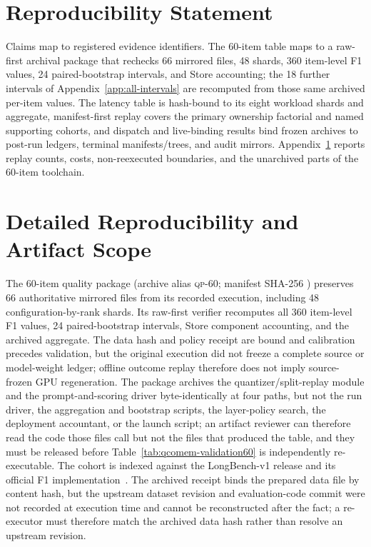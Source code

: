 \documentclass{article}
\begin{document}
\section*{Reproducibility Statement}
Claims map to registered evidence identifiers. The 60-item table maps to a
raw-first archival package that rechecks 66 mirrored files, 48 shards, 360
item-level F1 values, 24 paired-bootstrap intervals, and Store accounting; the
18 further intervals of Appendix~\ref{app:all-intervals} are recomputed from
those same archived per-item values. The latency table is hash-bound to its
eight workload shards and aggregate, manifest-first replay covers the primary
ownership factorial and named supporting cohorts, and dispatch and live-binding
results bind frozen archives to post-run ledgers, terminal manifests/trees, and
audit mirrors. Appendix~\ref{app:reproducibility} reports replay counts, costs,
non-reexecuted boundaries, and the unarchived parts of the 60-item toolchain.




\appendix

\section{Detailed Reproducibility and Artifact Scope}
\label{app:reproducibility}

The 60-item quality package (archive alias \textsc{qp-60}; manifest SHA-256
)
preserves 66 authoritative mirrored files from its recorded execution,
including 48 configuration-by-rank shards.  Its
raw-first verifier recomputes all 360 item-level F1 values, 24 paired-bootstrap
intervals, Store component accounting, and the archived aggregate.  The data
hash and policy receipt are bound and calibration precedes validation, but the
original execution did not freeze a complete source or model-weight ledger;
offline outcome replay therefore does not imply source-frozen GPU
regeneration.  The package archives the quantizer/split-replay module and the
prompt-and-scoring driver byte-identically at four paths, but not the run
driver, the aggregation and bootstrap scripts, the layer-policy search, the
deployment accountant, or the launch script; an artifact reviewer can therefore
read the code those files call but not the files that produced the table, and
they must be released before Table~\ref{tab:qcomem-validation60} is
independently re-executable.  The cohort is indexed against the LongBench-v1
release and its official F1
implementation~\citep{bai2024longbenchrelease,bai2024longbenchcode}.  The
archived receipt binds the prepared data file by content hash, but the upstream
dataset revision and evaluation-code commit were not recorded at execution time
and cannot be reconstructed after the fact; a re-executor must therefore match
the archived data hash rather than resolve an upstream revision.
\end{document}
